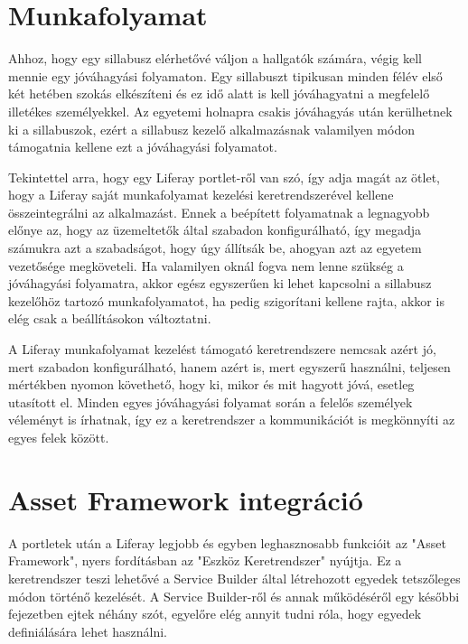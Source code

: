 \documentclass[hidelinks, 12pt, a4paper]{report}
\begin{document}
\section{Munkafolyamat}

Ahhoz, hogy egy sillabusz elérhetővé váljon a hallgatók számára, végig kell mennie egy jóváhagyási folyamaton. Egy sillabuszt tipikusan minden félév első két hetében szokás elkészíteni és ez idő alatt is kell jóváhagyatni a megfelelő illetékes személyekkel. Az egyetemi holnapra csakis jóváhagyás után kerülhetnek ki a sillabuszok, ezért a sillabusz kezelő alkalmazásnak valamilyen módon támogatnia kellene ezt a jóváhagyási folyamatot.

Tekintettel arra, hogy egy Liferay portlet-ről van szó, így adja magát az ötlet, hogy a Liferay saját munkafolyamat kezelési keretrendszerével kellene összeintegrálni az alkalmazást. Ennek a beépített folyamatnak a legnagyobb előnye az, hogy az üzemeltetők által szabadon konfigurálható, így megadja számukra azt a szabadságot, hogy úgy állítsák be, ahogyan azt az egyetem vezetősége megköveteli. Ha valamilyen oknál fogva nem lenne szükség a jóváhagyási folyamatra, akkor egész egyszerűen ki lehet kapcsolni a sillabusz kezelőhöz tartozó munkafolyamatot, ha pedig szigorítani kellene rajta, akkor is elég csak a beállításokon változtatni.

A Liferay munkafolyamat kezelést támogató keretrendszere nemcsak azért jó, mert szabadon konfigurálható, hanem azért is, mert egyszerű használni, teljesen mértékben nyomon követhető, hogy ki, mikor és mit hagyott jóvá, esetleg utasított el. Minden egyes jóváhagyási folyamat során a felelős személyek véleményt is írhatnak, így ez a keretrendszer a kommunikációt is megkönnyíti az egyes felek között.

\section{Asset Framework integráció}

A portletek után a Liferay legjobb és egyben leghasznosabb funkcióit az "Asset Framework", nyers fordításban az "Eszköz Keretrendszer" nyújtja. Ez a keretrendszer teszi lehetővé a Service Builder által létrehozott egyedek tetszőleges módon történő kezelését. A Service Builder-ről és annak működéséről egy későbbi fejezetben ejtek néhány szót, egyelőre elég annyit tudni róla, hogy egyedek definiálására lehet használni.
\end{document}
